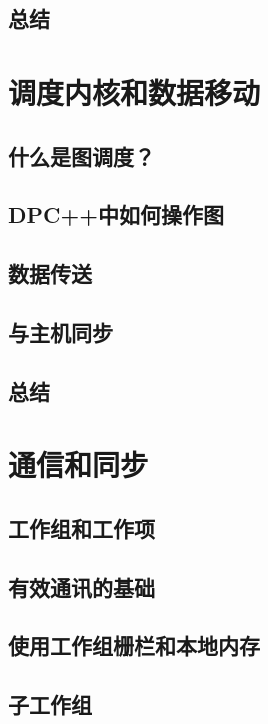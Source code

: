 \documentclass[11pt,a4paper,UTF8]{ctexart}
\begin{document}
		\subsection{总结}
		
	\section{调度内核和数据移动}
	
		\subsection{什么是图调度？}
		
		\subsection{DPC++中如何操作图}
		
		\subsection{数据传送}
		
		\subsection{与主机同步}
		
		\subsection{总结}
		
	\section{通信和同步}
	
		\subsection{工作组和工作项}
		
		\subsection{有效通讯的基础}
		
		\subsection{使用工作组栅栏和本地内存}
		
		\subsection{子工作组}
		
\end{document}

